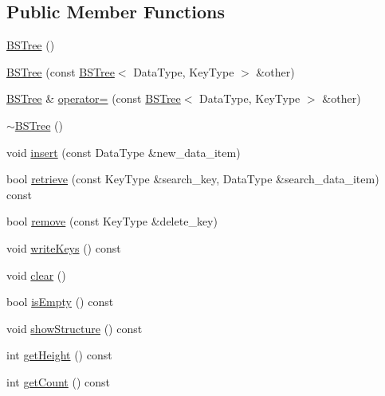 \subsection*{Public Member Functions}
\begin{DoxyCompactItemize}
\item 
\hyperlink{class_b_s_tree_a4513fc6697f5e51bff8e7c448b446c9e}{B\+S\+Tree} ()
\item 
\hyperlink{class_b_s_tree_a6658391c178cb35858c9c465e1839fb0}{B\+S\+Tree} (const \hyperlink{class_b_s_tree}{B\+S\+Tree}$<$ Data\+Type, Key\+Type $>$ \&other)
\item 
\hyperlink{class_b_s_tree}{B\+S\+Tree} \& \hyperlink{class_b_s_tree_ac36b0b564aa3c411c239d730f506f448}{operator=} (const \hyperlink{class_b_s_tree}{B\+S\+Tree}$<$ Data\+Type, Key\+Type $>$ \&other)
\item 
\hyperlink{class_b_s_tree_a968c51c539f4ae41357c78b6a60fea4c}{$\sim$\+B\+S\+Tree} ()
\item 
void \hyperlink{class_b_s_tree_a3136c063de9adf6f55e524ad099df62f}{insert} (const Data\+Type \&new\+\_\+data\+\_\+item)
\item 
bool \hyperlink{class_b_s_tree_a464aa205470b150038ff35dfa01d89b8}{retrieve} (const Key\+Type \&search\+\_\+key, Data\+Type \&search\+\_\+data\+\_\+item) const
\item 
bool \hyperlink{class_b_s_tree_a7750c081fd047304b6ded5f2df65b3f3}{remove} (const Key\+Type \&delete\+\_\+key)
\item 
void \hyperlink{class_b_s_tree_a0f0b3362a2b927092a464cb37edf59b3}{write\+Keys} () const
\item 
void \hyperlink{class_b_s_tree_a926822d08f3d0321603f9fafd2254b16}{clear} ()
\item 
bool \hyperlink{class_b_s_tree_aa79c2c24f8a4068dd01526674016b861}{is\+Empty} () const
\item 
void \hyperlink{class_b_s_tree_a66690333188606d533e4ad182922d9e1}{show\+Structure} () const
\item 
int \hyperlink{class_b_s_tree_a9e8f8c02f31a9ed55458b569dd809d62}{get\+Height} () const
\item 
int \hyperlink{class_b_s_tree_a138977042d1d7cbaa363fbcf435a1e88}{get\+Count} () const
\end{DoxyCompactItemize}

